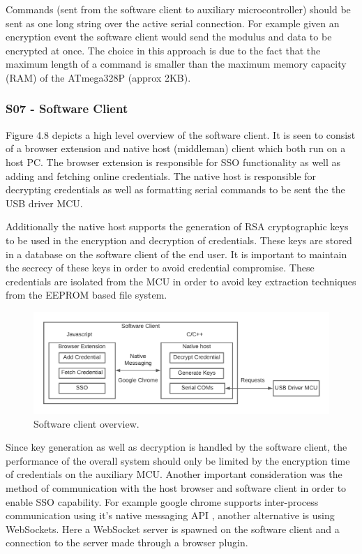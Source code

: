  Commands (sent from the software client to auxiliary microcontroller) should be sent as one long string over the active serial connection. For example given an encryption event the software client would send the modulus and data to be encrypted at once. The choice in this approach is due to the fact that the maximum length of a command is smaller than the maximum memory capacity (RAM) of the ATmega328P (approx 2KB).

\subsubsection{S07 - Software Client}
 Figure 4.8 depicts a high level overview of the software client. It is seen to consist of a browser extension and native host (middleman) client which both run on a host PC. The browser extension is responsible for SSO functionality as well as adding and fetching online credentials. The native host is responsible for decrypting credentials as well as formatting serial commands to be sent the the USB driver MCU. 

Additionally the native host supports the generation of RSA cryptographic keys to be used in the encryption and decryption of credentials. These keys are stored in a database on the software client of the end user. It is important to maintain the secrecy of these keys in order to avoid credential compromise. These credentials are isolated from the MCU in order to avoid key extraction techniques from the EEPROM based file system.
\begin{figure}[H]
\centering
\includegraphics[width=1\columnwidth]{Figures/Fig_59.png}
\caption{Software client overview.}
\label{fig:gantt}
\end{figure}

Since key generation as well as decryption is handled by the software client, the performance of the overall system should only be limited by the encryption time of credentials on the auxiliary MCU. Another important consideration was the method of communication with the host browser and software client in order to enable SSO capability. For example google chrome supports inter-process communication using it's native messaging API \cite{native_messaging}, another alternative is using WebSockets. Here a WebSocket server is spawned on the software client and a connection to the server made through a browser plugin. 

